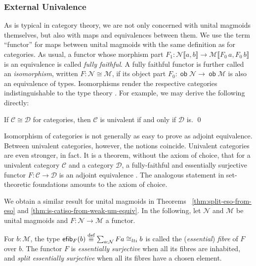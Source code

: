 \documentclass[runningheads]{llncs}
\newcommand*\rocqlogo{\usebox{\rocqlogobox}}
\newcommand{\lemmaref}[3]{\href{https://github.com/UniMath/UniMath/blob/94fae0eda57a778cec704bfa73b4ff525c9bc475/#1\#L#2?name=#3}{\rocqlogo}}
\newcommand{\acat}[1]{\mathcal{#1}}
\newcommand{\C}{\acat{C}}
\newcommand{\D}{\acat{D}}
\newcommand{\M}{\acat{M}}
\newcommand{\NN}{\acat{N}}
\newcommand{\Clti}[1]{#1_{lti}}
\DeclareMathOperator{\ob}{\mathsf{ob}}
\newcommand{\morsof}[3]{{#1}\llbracket{#2},{#3}\rrbracket}
\newcommand{\defequiv}{\overset{\mathrm{\textup{def}}}{\equiv}}
\newcommand{\fib}[1]{\mathsf{efib}_{#1}}
\begin{document}
\subsubsection*{External Univalence}
\label{sec:external-univalence}
As is typical in category theory, we are not only concerned with
unital magmoids themselves, but also with maps and equivalences
between them. We use the term ``functor'' for maps between unital
magmoids with the same definition as for categories. As usual, a
functor whose morphism part \(F_1 \colon \morsof\NN{a}{b} \to
\morsof\M{F_0\,a}{F_0\,b}\) is an equivalence is called \emph{fully
faithful}. A fully faithful functor is further called an
\emph{isomorphism}, written \(F : \NN \cong \M\), if its object part \(F_0
\colon \ob\NN \to \ob\M\) is also an equivalence of
types. Isomorphisms render the respective categories indistinguishable
to the type theory \cite[Lemma 6.16]{Ahrens15}. For example, we may
derive the following directly:

\begin{theorem}[{\lemmaref{UniMath/CategoryTheory/CategoryRXGraph.v}{214}{is\_univalent\_catiso\_iff}}]
\label{lem:univalence-over-catiso}
If \(\C \cong \D\) for categories, then \(\C\) is univalent if and
only if \(\D\) is.
\qed
\end{theorem}

Isomorphism of categories is not generally as easy to prove as adjoint
equivalence. Between univalent categories, however, the notions
coincide. Univalent categories are even stronger, in fact. It is a
theorem, without the axiom of choice, that for a univalent category
\(\C\) and a category \(\D\), a fully\hyp{}faithful and essentially
surjective functor \(F \colon \C \to \D\) is an adjoint equivalence
\cite{Ahrens15}.  The analogous statement in set\hyp{}theoretic
foundations amounts to the axiom of choice.

We obtain a similar result for unital magmoids in Theorems~
\ref{thm:split-eso-from-eso} and
\ref{thm:is-catiso-from-weak-um-equiv}. In the following, let \(\NN\)
and \(\M\) be unital magmoids and \(F \colon \NN \to \M\) a functor.

\begin{definition}[{\lemmaref{UniMath/CategoryTheory/Nonassociative/UnitalMagmoids/Functors.v}{312}{submm\_essentially\_surjective}}]
\label{def:um-eso}
For \(b : \M\), the type \(\fib{F}(b) \defequiv \sum_{a:\NN} Fa
\Clti\cong b\) is called the (\emph{essential}) \emph{fibre} of \(F\) over
\(b\). The functor \(F\) is \emph{essentially surjective} when all its
fibres are inhabited, and \emph{split essentially surjective} when all its
fibres have a chosen element.
\end{definition}
\end{document}
